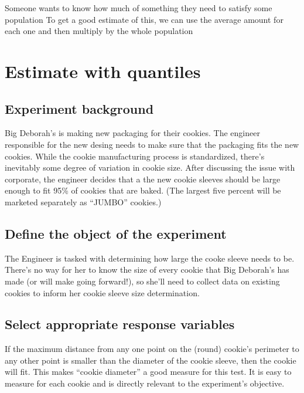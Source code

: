 \documentclass[
]{book}
\theoremstyle{definition}
\theoremstyle{definition}
\theoremstyle{definition}
\theoremstyle{remark}
\begin{document}
Someone wants to know how much of something they need to satisfy some population
To get a good estimate of this, we can use the average amount for each one and then multiply by the whole population

\hypertarget{estimate-with-quantiles}{%
\section{Estimate with quantiles}\label{estimate-with-quantiles}}

\hypertarget{experiment-background-1}{%
\subsection{Experiment background}\label{experiment-background-1}}

Big Deborah's is making new packaging for their cookies. The engineer responsible for the new desing needs to make sure that the packaging fits the new cookies. While the cookie manufacturing process is standardized, there's inevitably some degree of variation in cookie size. After discussing the issue with corporate, the engineer decides that a the new cookie sleeves should be large enough to fit 95\% of cookies that are baked. (The largest five percent will be marketed separately as ``JUMBO'' cookies.)

\hypertarget{define-the-object-of-the-experiment}{%
\subsection{Define the object of the experiment}\label{define-the-object-of-the-experiment}}

The Engineer is tasked with determining how large the cooke sleeve needs to be. There's no way for her to know the size of every cookie that Big Deborah's has made (or will make going forward!), so she'll need to collect data on existing cookies to inform her cookie sleeve size determination.

\hypertarget{select-appropriate-response-variables}{%
\subsection{Select appropriate response variables}\label{select-appropriate-response-variables}}

If the maximum distance from any one point on the (round) cookie's perimeter to any other point is smaller than the diameter of the cookie sleeve, then the cookie will fit. This makes ``cookie diameter'' a good measure for this test. It is easy to measure for each cookie and is directly relevant to the experiment's objective.
\end{document}
